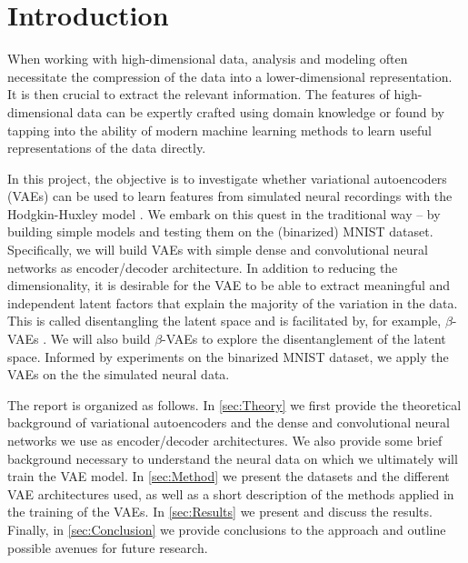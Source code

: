 \section{Introduction}\label{sec:Introduction}

When working with high-dimensional data, analysis and modeling often necessitate the compression of the data into a lower-dimensional representation. It is then crucial to extract the relevant information. The features of high-dimensional data can be expertly crafted using domain knowledge or found by tapping into the ability of modern machine learning methods to learn useful representations of the data directly.

In this project, the objective is to investigate whether variational autoencoders (VAEs) \citep{kingma2022autoencoding} can be used to learn features from simulated neural recordings with the Hodgkin-Huxley model \citep{HH1952}. We embark on this quest in the traditional way -- by building simple models and testing them on the (binarized) MNIST dataset. Specifically, we will build VAEs with simple dense and convolutional neural networks as encoder/decoder architecture. In addition to reducing the dimensionality, it is desirable for the VAE to be able to extract meaningful and independent latent factors that explain the majority of the variation in the data. This is called disentangling the latent space and is facilitated by, for example, $\beta$-VAEs \citep{higgins2017betavae}. We will also build $\beta$-VAEs to explore the disentanglement of the latent space. Informed by experiments on the binarized MNIST dataset, we apply the VAEs on the the simulated neural data.

The report is organized as follows. In \autoref{sec:Theory} we first provide the theoretical background of variational autoencoders and the dense and convolutional neural networks we use as encoder/decoder architectures. We also provide some brief background necessary to understand the neural data on which we ultimately will train the VAE model. In \autoref{sec:Method} we present the datasets and the different VAE architectures used, as well as a short description of the methods applied in the training of the VAEs. In \autoref{sec:Results} we present and discuss the results. Finally, in \autoref{sec:Conclusion} we provide conclusions to the approach and outline possible avenues for future research.
